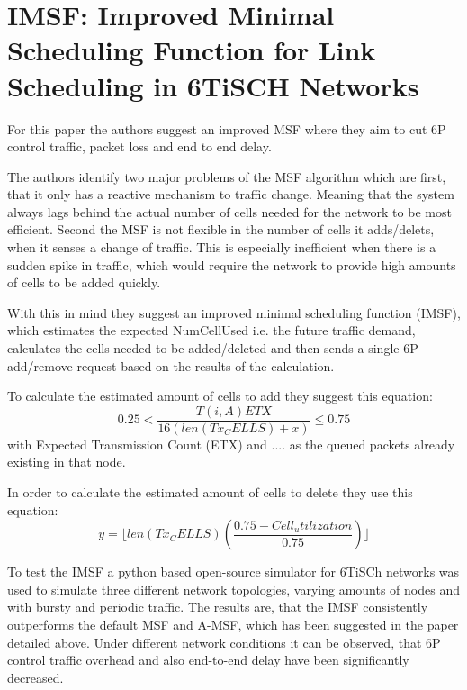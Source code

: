 \documentclass{comnets-thesis}
\begin{document}
\section{IMSF: Improved Minimal Scheduling Function for Link Scheduling in 6TiSCH Networks}
For this paper \cite{IMSF} the authors suggest an improved MSF where they aim to cut 6P control traffic, packet loss and end to end delay.

The authors identify two major problems of the MSF algorithm which are first, that it only has a reactive mechanism to traffic change. Meaning that the system always lags behind the actual number of cells needed for the network to be most efficient. Second the MSF is not flexible in the number of cells it adds/delets, when it senses a change of traffic. This is especially inefficient when there is a sudden spike in traffic, which would require the network to provide high amounts of cells to be added quickly.

With this in mind they suggest an improved minimal scheduling function (IMSF), which estimates the expected NumCellUsed i.e. the future traffic demand, calculates the cells needed to be added/deleted and then sends a single 6P add/remove request based on the results of the calculation. 

To calculate the estimated amount of cells to add they suggest this equation:
\begin{equation}
    0.25 < \frac{T(i,A) ETX}{16(len(Tx_CE LLS)+x)} \le 0.75
	\label{eq:imsf-estimated-cells-add}
\end{equation}
with Expected Transmission Count (ETX) and .... as the queued packets already existing in that node.

In order to calculate the estimated amount of cells to delete they use this equation:
\begin{equation}
    y=\lfloor len(Tx_CE LLS)(\frac{ 0.75 - Cell _utilization}{0.75}) \rfloor
	\label{eq:imsf-estimated-cells-delete}
\end{equation}

To test the IMSF a python based open-source simulator for 6TiSCh networks was used to simulate three different network topologies, varying amounts of nodes and with bursty and periodic traffic. The results are, that the IMSF consistently outperforms the default MSF and A-MSF, which has been suggested in the paper \cite{MSFPerformanceEvaluation} detailed above. Under different network conditions it can be observed, that 6P control traffic overhead and also end-to-end delay have been significantly decreased.
\end{document}
